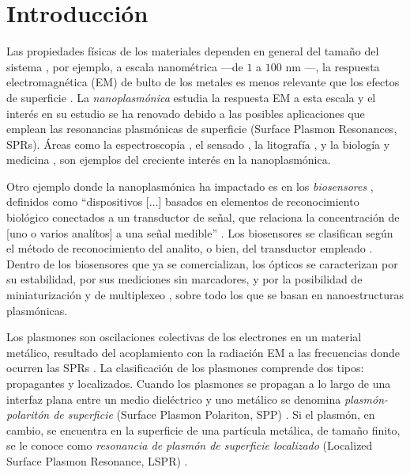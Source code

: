 \chapter*{Introducción}
\label{chapter:Motivacion}


Las propiedades f\'isicas de los materiales dependen en general del tamaño del sistema \cite{boverhof2015comparative}, por ejemplo, a escala nanom\'etrica ---de $1$ a $100$ nm \cite{boverhof2015comparative}---, la respuesta electromagn\'etica (EM) de bulto de los metales es menos relevante que los efectos de superficie \cite{zhao2008methods}.  La \emph{nanoplasm\'onica} estudia la respuesta EM a esta escala y el inter\'es en su estudio se ha renovado debido a las posibles aplicaciones que emplean las resonancias plasm\'onicas de superficie (Surface Plasmon Resonances, SPRs).  Áreas como la espectroscop\'ia \cite{novotny2006principles}, el sensado \cite{jain2008noble}, la litograf\'ia \cite{stockman2011nanoplasmonics}, y la biolog\'ia y  medicina \cite{jain2008noble}, son ejemplos del creciente interés en la nanoplasmónica. 


Otro ejemplo donde la nanoplasmónica ha impactado es en los \textit{biosensores} \cite{estevez2014trends,mun2015nanobiosensors}, definidos como ``dispositivos [$\ldots$] basados en elementos de reconocimiento biológico conectados a un transductor de señal, que relaciona la concentración de [uno o varios analítos] a una señal medible'' \cite{mun2015nanobiosensors}. Los biosensores se clasifican según el método de reconocimiento del analito, o bien, del transductor empleado \cite{mun2015nanobiosensors}. Dentro de los biosensores que ya se comercializan, los ópticos se caracterizan por su estabilidad, por sus mediciones sin marcadores, y por la  posibilidad de miniaturización y de multiplexeo \cite{estevez2014trends}, sobre todo los que se basan en nanoestructuras plasmónicas.

Los plasmones son oscilaciones colectivas de los electrones en un material metálico,  resultado del  acoplamiento con la radiaci\'on EM a las frecuencias donde ocurren las SPRs \cite{stockman2011nanoplasmonics}.  La clasificación de los plasmones comprende  dos tipos: propagantes y localizados.  Cuando los plasmones se propagan a lo largo de una interfaz plana entre un medio diel\'ectrico y uno met\'alico se denomina  \emph{plasm\'on-polarit\'on de superficie} (Surface Plasmon Polariton, SPP) \cite{maier2007plasmonics}.  Si el plasmón, en cambio, se encuentra en la superficie de una partícula  met\'alica, de tamaño finito, se le conoce como \emph{resonancia de plasm\'on de superficie localizado} (Localized Surface Plasmon Resonance, LSPR) \cite{maier2007plasmonics}.

